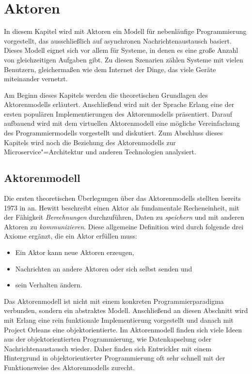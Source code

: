 \chapter{Aktoren}

In diesem Kapitel wird mit Aktoren ein Modell für nebenläufige Programmierung vorgestellt, das ausschließlich auf asynchronen Nachrichtenaustausch basiert. Dieses Modell eignet sich vor allem für Systeme, in denen es eine große Anzahl von gleichzeitigen Aufgaben gibt. Zu diesen Szenarien zählen Systeme mit vielen Benutzern, gleichermaßen wie dem Internet der Dinge, das viele  Geräte miteinander vernetzt.

Am Beginn dieses Kapitels werden die theoretischen Grundlagen des Aktorenmodells erläutert. Anschließend wird mit der Sprache Erlang eine der ersten populären Implementierungen des Aktorenmodells präsentiert. Darauf aufbauend wird mit dem virtuellen Aktorenmodell eine mögliche Vereinfachung des Programmiermodells vorgestellt und diskutiert. Zum Abschluss dieses Kapitels wird noch die Beziehung des Aktorenmodells zur Microservice"=Architektur und anderen Technologien analysiert.

\section{Aktorenmodell}
\label{sec:actor-model}

Die ersten theoretischen Überlegungen über das Aktorenmodells stellten \citeauthor{Hewitt:1973:UMA:1624775.1624804} bereits 1973 in \cite{Hewitt:1973:UMA:1624775.1624804} an. Hewitt beschreibt einen Aktor als fundamentale Recheneinheit, mit der Fähigkeit  \textit{Berechnungen} durchzuführen, Daten zu \textit{speichern} und mit anderen Aktoren zu \textit{kommunizieren}. Diese allgemeine Definition wird durch folgende drei Axiome ergänzt, die ein Aktor erfüllen muss:

\begin{itemize}
	\item Ein Aktor kann neue Aktoren erzeugen,
	\item Nachrichten an andere Aktoren oder sich selbst senden und
	\item sein Verhalten ändern.
\end{itemize}

\noindent
Das Aktorenmodell ist nicht mit einem konkreten Programmierparadigma verbunden, sondern ein abstraktes Modell. Anschließend an diesen Abschnitt wird mit Erlang eine rein funktionale Implementierung vorgestellt und danach mit Project Orleans eine objektorientierte. Im Aktorenmodell finden sich viele Ideen aus der objektorientierten Programmierung, wie \zB Datenkapselung oder Nachrichtenaustausch wieder. Daher finden sich Entwickler mit einem Hintergrund in objektorientierter Programmierung oft sehr schnell mit der Funktionsweise des Aktorenmodells zurecht.

